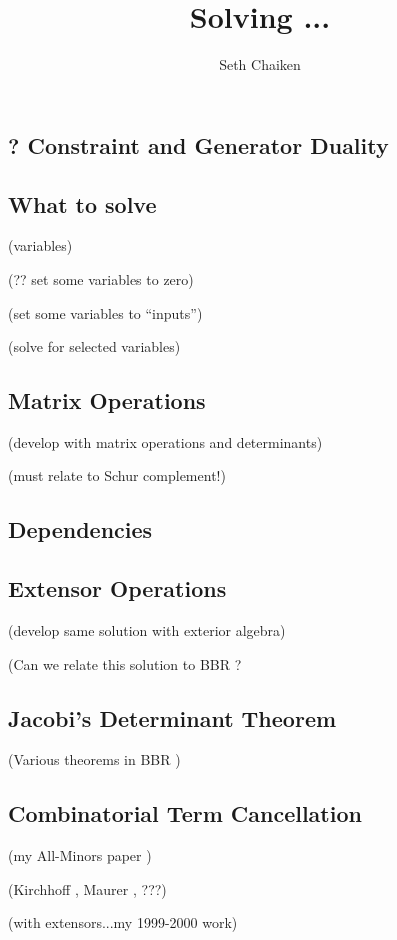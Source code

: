 \documentclass{article}
\title{Solving ... }
\author{Seth Chaiken}
\begin{document}
\maketitle
\subsection{? Constraint and Generator Duality}


\subsection{What to solve}

(variables) ~\cite{OMBOOK}

(?? set some variables to zero)

(set some variables to ``inputs'')

(solve for selected variables) 

\subsection{Matrix Operations}

(develop with matrix operations and determinants)


(must relate to Schur complement!)

\subsection{Dependencies}
\subsection{Extensor Operations}

(develop same solution with exterior algebra)

(Can we relate this solution to BBR \cite{exteriorCalc}?


\subsection{Jacobi's Determinant Theorem}

(Various theorems in 
BBR \cite{exteriorCalc})

\subsection{Combinatorial Term Cancellation}

(my All-Minors paper \cite{sdcMTT} )

(Kirchhoff \cite{Kirchhoff}, Maurer \cite{Maurer76}, ???)

(with extensors...my 1999-2000 work)

{}

\end{document}
